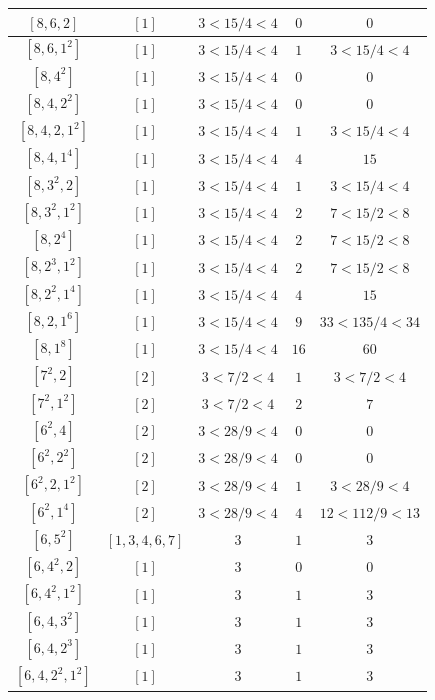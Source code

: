 \documentclass{article}%
\begin{document}
\begin{center}
\begin{longtable}{||c|c|c|c|c||}
$[8, 6, 2]$ & $[1]$ & $3 < 15/4 < 4$ & $0$ & $0$ \\ \hline 
$[8, 6, 1^{2}]$ & $[1]$ & $3 < 15/4 < 4$ & $1$ & $3 < 15/4 < 4$ \\ \hline 
$[8, 4^{2}]$ & $[1]$ & $3 < 15/4 < 4$ & $0$ & $0$ \\ \hline 
$[8, 4, 2^{2}]$ & $[1]$ & $3 < 15/4 < 4$ & $0$ & $0$ \\ \hline 
$[8, 4, 2, 1^{2}]$ & $[1]$ & $3 < 15/4 < 4$ & $1$ & $3 < 15/4 < 4$ \\ \hline 
$[8, 4, 1^{4}]$ & $[1]$ & $3 < 15/4 < 4$ & $4$ & $15$ \\ \hline 
$[8, 3^{2}, 2]$ & $[1]$ & $3 < 15/4 < 4$ & $1$ & $3 < 15/4 < 4$ \\ \hline 
$[8, 3^{2}, 1^{2}]$ & $[1]$ & $3 < 15/4 < 4$ & $2$ & $7 < 15/2 < 8$ \\ \hline 
$[8, 2^{4}]$ & $[1]$ & $3 < 15/4 < 4$ & $2$ & $7 < 15/2 < 8$ \\ \hline 
$[8, 2^{3}, 1^{2}]$ & $[1]$ & $3 < 15/4 < 4$ & $2$ & $7 < 15/2 < 8$ \\ \hline 
$[8, 2^{2}, 1^{4}]$ & $[1]$ & $3 < 15/4 < 4$ & $4$ & $15$ \\ \hline 
$[8, 2, 1^{6}]$ & $[1]$ & $3 < 15/4 < 4$ & $9$ & $33 < 135/4 < 34$ \\ \hline 
$[8, 1^{8}]$ & $[1]$ & $3 < 15/4 < 4$ & $16$ & $60$ \\ \hline 
$[7^{2}, 2]$ & $[2]$ & $3 < 7/2 < 4$ & $1$ & $3 < 7/2 < 4$ \\ \hline 
$[7^{2}, 1^{2}]$ & $[2]$ & $3 < 7/2 < 4$ & $2$ & $7$ \\ \hline 
$[6^{2}, 4]$ & $[2]$ & $3 < 28/9 < 4$ & $0$ & $0$ \\ \hline 
$[6^{2}, 2^{2}]$ & $[2]$ & $3 < 28/9 < 4$ & $0$ & $0$ \\ \hline 
$[6^{2}, 2, 1^{2}]$ & $[2]$ & $3 < 28/9 < 4$ & $1$ & $3 < 28/9 < 4$ \\ \hline 
$[6^{2}, 1^{4}]$ & $[2]$ & $3 < 28/9 < 4$ & $4$ & $12 < 112/9 < 13$ \\ \hline 
$[6, 5^{2}]$ & $[1, 3, 4, 6, 7]$ & $3$ & $1$ & $3$ \\ \hline 
$[6, 4^{2}, 2]$ & $[1]$ & $3$ & $0$ & $0$ \\ \hline 
$[6, 4^{2}, 1^{2}]$ & $[1]$ & $3$ & $1$ & $3$ \\ \hline 
$[6, 4, 3^{2}]$ & $[1]$ & $3$ & $1$ & $3$ \\ \hline 
$[6, 4, 2^{3}]$ & $[1]$ & $3$ & $1$ & $3$ \\ \hline 
$[6, 4, 2^{2}, 1^{2}]$ & $[1]$ & $3$ & $1$ & $3$ \\ \hline 

\end{longtable}
\end{center}
\end{document}
